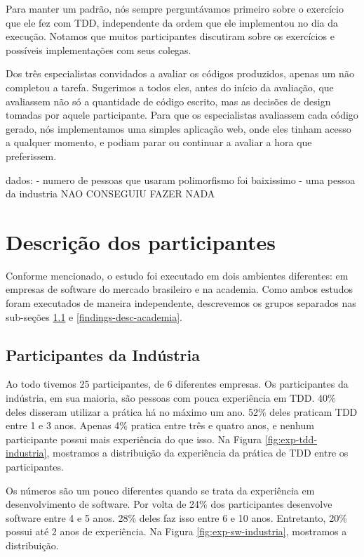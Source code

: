 Para manter um padrão, nós sempre perguntávamos primeiro sobre o exercício que ele
fez com TDD, independente da ordem que ele implementou no dia da execução. Notamos
que muitos participantes discutiram sobre os exercícios e possíveis implementações com seus colegas.

Dos três especialistas convidados a avaliar os códigos produzidos, apenas um não
completou a tarefa. Sugerimos a todos eles, antes do início da avaliação, que avaliassem
não só a quantidade de código escrito, mas as decisões de design tomadas por aquele
participante. Para que os especialistas avaliassem cada código gerado, nós implementamos
uma simples aplicação web, onde eles tinham acesso a qualquer momento, e podiam parar ou continuar
a avaliar a hora que preferissem.

dados:
- numero de pessoas que usaram polimorfismo foi baixissimo
- uma pessoa da industria NAO CONSEGUIU FAZER NADA

\section{Descrição dos participantes}

Conforme mencionado, o estudo foi executado em dois ambientes diferentes: em empresas de software
do mercado brasileiro e na academia. Como ambos estudos foram executados de maneira independente,
descrevemos os grupos separados nas sub-seções \ref{findings-desc-industria} e \ref{findings-desc-academia}.

\subsection{Participantes da Indústria}
\label{findings-desc-industria}

Ao todo tivemos 25 participantes, de 6 diferentes empresas.
Os participantes da indústria, em sua maioria, são pessoas com pouca experiência em TDD.
40\% deles disseram utilizar a prática há no máximo um ano. 52\% deles praticam TDD
entre 1 e 3 anos. Apenas 4\% pratica entre três e quatro anos, e nenhum participante
possui mais experiência do que isso. Na Figura \ref{fig:exp-tdd-industria}, mostramos
a distribuição da experiência da prática de TDD entre os participantes.

Os números são um pouco diferentes quando se trata da experiência em desenvolvimento
de software. Por volta de 24\% dos participantes desenvolve software entre 4 e 5 anos.
28\% deles faz isso entre 6 e 10 anos. Entretanto, 20\% possui até 2 anos de experiência.
Na Figura \ref{fig:exp-sw-industria}, mostramos a distribuição.

